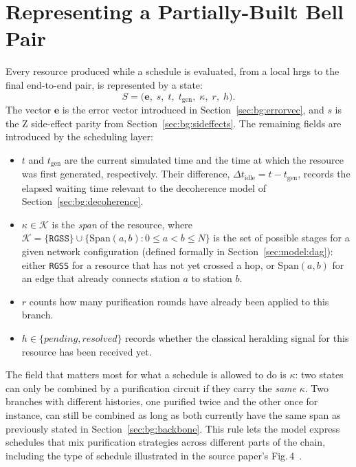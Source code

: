 \section{Representing a Partially-Built Bell Pair}
\label{sec:model:state}

Every resource produced while a schedule is evaluated, from a local \Gls{hrgs} to the final end-to-end pair, is represented by a state:
\[
    S = \bigl(\mathbf{e},\; s,\; t,\; t_{\mathrm{gen}},\; \kappa,\; r,\; h\bigr).
\]
The vector $\mathbf{e}$ is the error vector introduced in Section~\ref{sec:bg:errorvec}, and $s$ is the Z side-effect parity from Section~\ref{sec:bg:sideffects}. The remaining fields are introduced by the scheduling layer:
\begin{itemize}
    \item $t$ and $t_{\mathrm{gen}}$ are the current simulated time and the time at which the resource was first generated, respectively. Their difference, $\Delta t_{\mathrm{idle}} = t - t_{\mathrm{gen}}$, records the elapsed waiting time relevant to the decoherence model of Section~\ref{sec:bg:decoherence}.
    \item $\kappa \in \mathcal{K}$ is the \emph{span} of the resource, where $\mathcal{K} = \{\mathtt{RGSS}\} \cup \{\mathrm{Span}(a,b) : 0 \le a < b \le N\}$ is the set of possible stages for a given network configuration (defined formally in Section~\ref{sec:model:dag}): either \texttt{RGSS} for a resource that has not yet crossed a hop, or $\mathrm{Span}(a,b)$ for an edge that already connects station $a$ to station $b$.
    \item $r$ counts how many purification rounds have already been applied to this branch.
    \item $h \in \{\mathit{pending}, \mathit{resolved}\}$ records whether the classical heralding signal for this resource has been received yet.
\end{itemize}
The field that matters most for what a schedule is allowed to do is $\kappa$: two states can only be combined by a purification circuit if they carry the \emph{same} $\kappa$. Two branches with different histories, one purified twice and the other once for instance, can still be combined as long as both currently have the same span as previously stated in Section~\ref{sec:bg:backbone}. This rule lets the model express schedules that mix purification strategies across different parts of the chain, including the type of schedule illustrated in the source paper's Fig.\,4~\cite{Benchasattabuse2025Integrating}.

